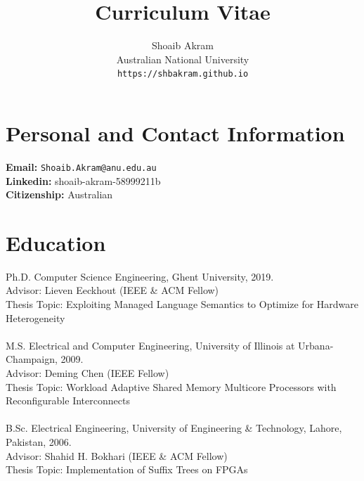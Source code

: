 \documentclass[singlecolumn,singlespace,11pt,a4paper]{article}
\begin{document}
\title{ { \bfseries Curriculum Vitae} }
\author{Shoaib Akram\\
	Australian National University \\
        \texttt{https://shbakram.github.io}
       }
\date{}
\maketitle

\section*{Personal and Contact Information}

\noindent \textbf{Email:} \texttt{Shoaib.Akram@anu.edu.au} \\ 
\noindent \textbf{Linkedin:} shoaib-akram-58999211b \\
\noindent \textbf{Citizenship:} Australian

\section*{Education}
\noindent Ph.D. Computer Science Engineering, Ghent University, 2019. \\
Advisor: Lieven Eeckhout (IEEE \& ACM Fellow)  \\
Thesis Topic: Exploiting Managed Language Semantics to Optimize for Hardware Heterogeneity
\\
\\
\noindent M.S. Electrical and Computer Engineering, University of Illinois at Urbana-Champaign, 2009. \\
Advisor: Deming Chen (IEEE Fellow) \\
Thesis Topic: Workload Adaptive Shared Memory Multicore Processors with Reconfigurable Interconnects
\\
\\
\noindent B.Sc. Electrical Engineering, University of Engineering \& Technology, Lahore, Pakistan, 2006.\\
Advisor: Shahid H. Bokhari (IEEE \& ACM Fellow) \\
Thesis Topic: Implementation of Suffix Trees on FPGAs 
\end{document}

